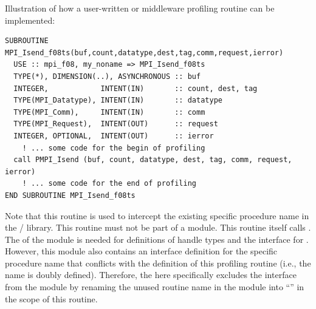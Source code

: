 \begin{users}
\begin{example}
\label{exa:fortran:measurement:wrapper}
Illustration of how
a user-written or middleware profiling routine
can be implemented:
\begin{lstlisting}[language={[MPI08]Fortran},basicstyle=\lstsmall]
SUBROUTINE MPI_Isend_f08ts(buf,count,datatype,dest,tag,comm,request,ierror)
  USE :: mpi_f08, my_noname => MPI_Isend_f08ts
  TYPE(*), DIMENSION(..), ASYNCHRONOUS :: buf
  INTEGER,            INTENT(IN)       :: count, dest, tag
  TYPE(MPI_Datatype), INTENT(IN)       :: datatype
  TYPE(MPI_Comm),     INTENT(IN)       :: comm
  TYPE(MPI_Request),  INTENT(OUT)      :: request
  INTEGER, OPTIONAL,  INTENT(OUT)      :: ierror
    ! ... some code for the begin of profiling
  call PMPI_Isend (buf, count, datatype, dest, tag, comm, request, ierror)
    ! ... some code for the end of profiling
END SUBROUTINE MPI_Isend_f08ts
\end{lstlisting}

Note that this routine is used to intercept the existing specific
procedure name  in the \MPI/ library.
This routine must not be part of a module.
This routine itself calls .
The  of the  module is needed for
definitions of handle types and the interface for .
However, this module also contains an interface definition for
the specific procedure name  that conflicts
with the definition of this profiling routine (i.e., the name is
doubly defined).
Therefore, the  here specifically excludes the interface
from the module by renaming the unused routine name in the
 module into ``'' in the scope of this routine.
\end{example}
\end{users}

